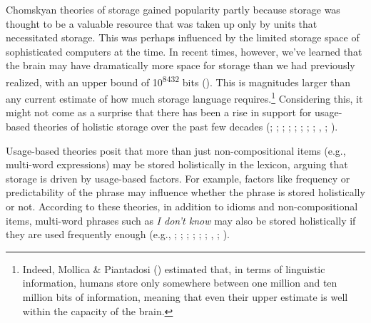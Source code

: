 \documentclass[
  12pt,
  letterpaper,
]{scrreport}
\begin{document}
Chomskyan theories of storage gained popularity partly because storage
was thought to be a valuable resource that was taken up only by units
that necessitated storage. This was perhaps influenced by the limited
storage space of sophisticated computers at the time. In recent times,
however, we've learned that the brain may have dramatically more space
for storage than we had previously realized, with an upper bound of
10\textsuperscript{8432} bits
().
This is magnitudes larger than any current estimate of how much storage
language requires.\footnote{Indeed, Mollica \& Piantadosi
  () estimated that,
  in terms of linguistic information, humans store only somewhere
  between one million and ten million bits of information, meaning that
  even their upper estimate is well within the capacity of the brain.}
Considering this, it might not come as a surprise that there has been a
rise in support for usage-based theories of holistic storage over the
past few decades
(;
;
; ; ; ;
; ;
, ;
).

Usage-based theories posit that more than just non-compositional items
(e.g., multi-word expressions) may be stored holistically in the
lexicon, arguing that storage is driven by usage-based factors. For
example, factors like frequency or predictability of the phrase may
influence whether the phrase is stored holistically or not. According to
these theories, in addition to idioms and non-compositional items,
multi-word phrases such as \emph{I don't know} may also be stored
holistically if they are used frequently enough (e.g.,
;
;
;
;
;
;
, ;
).
\end{document}
